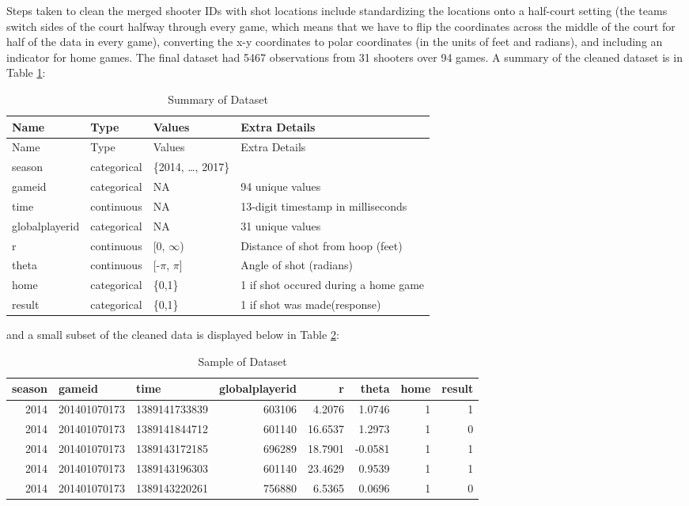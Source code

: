 \documentclass[12pt,twoside]{dukestatscithesis}
\theoremstyle{definition}
\theoremstyle{definition}
\theoremstyle{definition}
\theoremstyle{remark}
\begin{document}
Steps taken to clean the merged shooter IDs with shot locations include
standardizing the locations onto a half-court setting (the teams switch
sides of the court halfway through every game, which means that we have
to flip the coordinates across the middle of the court for half of the
data in every game), converting the x-y coordinates to polar coordinates
(in the units of feet and radians), and including an indicator for home
games. The final dataset had 5467 observations from 31 shooters over 94
games. A summary of the cleaned dataset is in Table
\ref{tab:tablesummary}:
\begin{longtable}[]{@{}llll@{}}
\caption{\label{tab:tablesummary}Summary of Dataset}\tabularnewline
\toprule
Name & Type & Values & Extra Details\tabularnewline
\midrule
\endfirsthead
\toprule
Name & Type & Values & Extra Details\tabularnewline
\midrule
\endhead
season & categorical & \{2014, \ldots{}, 2017\} &\tabularnewline
gameid & categorical & NA & 94 unique values\tabularnewline
time & continuous & NA & 13-digit timestamp in
milliseconds\tabularnewline
globalplayerid & categorical & NA & 31 unique values\tabularnewline
r & continuous & {[}0, \(\infty\)) & Distance of shot from hoop
(feet)\tabularnewline
theta & continuous & {[}-\(\pi\), \(\pi\){]} & Angle of shot
(radians)\tabularnewline
home & categorical & \{0,1\} & 1 if shot occured during a home
game\tabularnewline
result & categorical & \{0,1\} & 1 if shot was
made(response)\tabularnewline
\bottomrule
\end{longtable}
and a small subset of the cleaned data is displayed below in Table
\ref{tab:tablesample}:

\begingroup\fontsize{11}{13}\selectfont
\begin{longtable}[t]{rllrrrrr}
\caption[Data Sample]{\label{tab:tablesample}Sample of Dataset}\\
\toprule
season & gameid & time & globalplayerid & r & theta & home & result\\
\midrule
2014 & 201401070173 & 1389141733839 & 603106 & 4.2076 & 1.0746 & 1 & 1\\
2014 & 201401070173 & 1389141844712 & 601140 & 16.6537 & 1.2973 & 1 & 0\\
2014 & 201401070173 & 1389143172185 & 696289 & 18.7901 & -0.0581 & 1 & 1\\
2014 & 201401070173 & 1389143196303 & 601140 & 23.4629 & 0.9539 & 1 & 1\\
2014 & 201401070173 & 1389143220261 & 756880 & 6.5365 & 0.0696 & 1 & 0\\
\bottomrule
\end{longtable}
\endgroup{}
\end{document}
